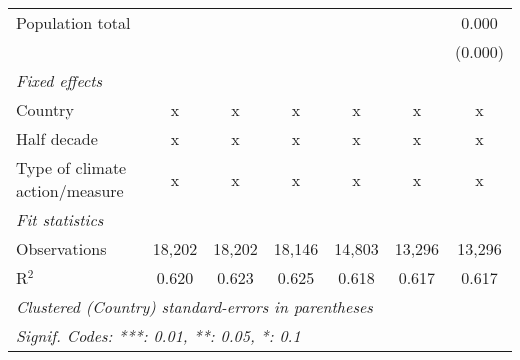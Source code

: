 \begin{tabular}{lcccccc}
   Population total                                            &               &                &                &                &               & 0.000\\   
                                                               &               &                &                &                &               & (0.000)\\   
   \emph{Fixed effects}\\
   Country                                                     & x             & x              & x              & x              & x             & x\\  
   Half decade                                                 & x             & x              & x              & x              & x             & x\\  
   Type of climate action/measure                              & x             & x              & x              & x              & x             & x\\  
   \midrule \emph{Fit statistics}\\
   Observations                                                & 18,202        & 18,202         & 18,146         & 14,803         & 13,296        & 13,296\\  
   R$^2$                                                       & 0.620         & 0.623          & 0.625          & 0.618          & 0.617         & 0.617\\  
   \midrule
   \multicolumn{7}{l}{\emph{Clustered (Country) standard-errors in parentheses}}\\
   \multicolumn{7}{l}{\emph{Signif. Codes: ***: 0.01, **: 0.05, *: 0.1}}\\
\end{tabular}
\par\endgroup


